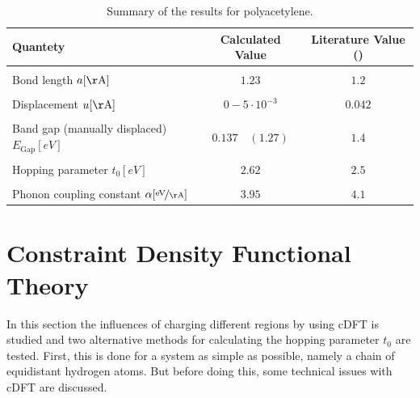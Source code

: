 \begin{table}[]
	\centering
	\begin{tabular}{l|c|c}
	Quantety & Calculated Value & Literature Value (\cite{PhysRevLett.42.1698, doi:10.1021/cr990357p})\\
	\hline \hline
	&&\\[-.3cm]
	Bond length \hfill$a [\unit{\AA}]$ & $1.23$ & $1.2$\\ \hline&&\\[-.3cm]
	Displacement \hfill$u [\unit{\AA}]$& $0 - 5\cdot10^{-3}$ & $0.042$\\ \hline&&\\[-.3cm]
	Band gap (manually displaced)\hfill$E_\text{Gap} [\unit{eV}]$ & $0.137\quad(1.27)$ & $1.4$\\ \hline &&\\[-.3cm]
	Hopping parameter \hfill$t_0 [\unit{eV}]$ & $2.62$ & $2.5$ \\ \hline&&\\[-.3cm]
	Phonon coupling constant \hspace*{2cm}$\alpha [\unitfrac{eV}{\AA}]$& $3.95$ & $4.1$
	\end{tabular}
	\caption{Summary of the results for polyacetylene.}
	\label{table_summary_polyacetylene}
\end{table}


\section{Constraint Density Functional Theory}
\label{section_constraint_density_functonal_theory}
In this section the influences of charging different regions by using cDFT is studied and two alternative methods for calculating the hopping parameter $t_0$ are tested. First, this is done for a system as simple as possible, namely a chain of equidistant hydrogen atoms. But before doing this, some technical issues with cDFT are discussed.
